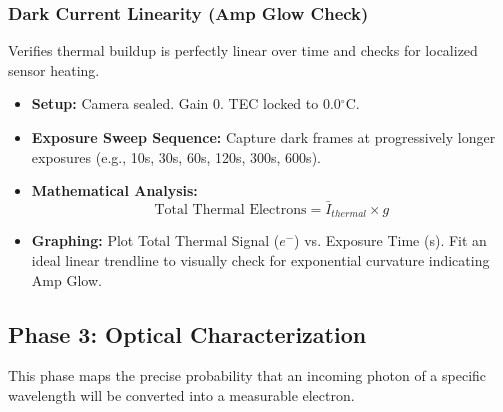 \documentclass[11pt,a4paper]{article}
\begin{document}
\subsubsection{Dark Current Linearity (Amp Glow Check)}
Verifies thermal buildup is perfectly linear over time and checks for localized sensor heating.
\begin{itemize}[leftmargin=*]
    \item \textbf{Setup:} Camera sealed. Gain 0. TEC locked to 0.0$^\circ$C.
    \item \textbf{Exposure Sweep Sequence:} Capture dark frames at progressively longer exposures (e.g., 10s, 30s, 60s, 120s, 300s, 600s). 
    \item \textbf{Mathematical Analysis:} 
    $$ \text{Total Thermal Electrons} = \bar{I}_{thermal} \times g $$
    \item \textbf{Graphing:} Plot Total Thermal Signal ($e^-$) vs. Exposure Time (s). Fit an ideal linear trendline to visually check for exponential curvature indicating Amp Glow.
\end{itemize}

\subsection{Phase 3: Optical Characterization}
This phase maps the precise probability that an incoming photon of a specific wavelength will be converted into a measurable electron.
\end{document}
